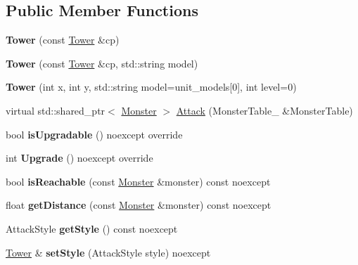 \subsection*{Public Member Functions}
\begin{DoxyCompactItemize}
\item 
\mbox{\label{classbase__structures_1_1Tower_aac91e892264021f990ec317a79552a06}} 
{\bfseries Tower} (const \hyperlink{classbase__structures_1_1Tower}{Tower} \&cp)
\item 
\mbox{\label{classbase__structures_1_1Tower_aea96cb9cf96ed679bcdebafd5499af18}} 
{\bfseries Tower} (const \hyperlink{classbase__structures_1_1Tower}{Tower} \&cp, std\+::string model)
\item 
\mbox{\label{classbase__structures_1_1Tower_ab11a1cebdefb93c49943aa0c59b3a461}} 
{\bfseries Tower} (int x, int y, std\+::string model=unit\+\_\+models\mbox{[}0\mbox{]}, int level=0)
\item 
virtual std\+::shared\+\_\+ptr$<$ \hyperlink{classbase__structures_1_1Monster}{Monster} $>$ \hyperlink{classbase__structures_1_1Tower_a59b5bb7e3782ea27f53a89866dceabde}{Attack} (Monster\+Table\+\_\+ \&Monster\+Table)
\item 
\mbox{\label{classbase__structures_1_1Tower_acb8189d5ac8f35992fc2e33b60dad29e}} 
bool {\bfseries is\+Upgradable} () noexcept override
\item 
\mbox{\label{classbase__structures_1_1Tower_a3dba0ab4ea12eed5182a951c7edc9945}} 
int {\bfseries Upgrade} () noexcept override
\item 
\mbox{\label{classbase__structures_1_1Tower_ac211d840efd1f4baa2f3dc17d73800e2}} 
bool {\bfseries is\+Reachable} (const \hyperlink{classbase__structures_1_1Monster}{Monster} \&monster) const noexcept
\item 
\mbox{\label{classbase__structures_1_1Tower_a5c9cad208ca424e7f618b5997ae73c1b}} 
float {\bfseries get\+Distance} (const \hyperlink{classbase__structures_1_1Monster}{Monster} \&monster) const noexcept
\item 
\mbox{\label{classbase__structures_1_1Tower_a64b5b93dcd360ef50338ddbd779492e2}} 
Attack\+Style {\bfseries get\+Style} () const noexcept
\item 
\mbox{\label{classbase__structures_1_1Tower_afa9a8342b9d2eb5940b6d3878c1788b5}} 
\hyperlink{classbase__structures_1_1Tower}{Tower} \& {\bfseries set\+Style} (Attack\+Style style) noexcept
\end{DoxyCompactItemize}
